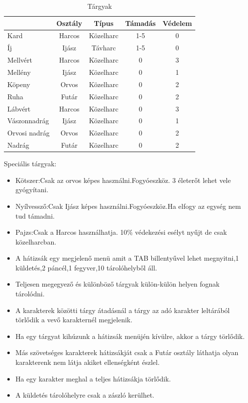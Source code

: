 \newpage


\begin{table}[!ht]
\centering
\caption{Tárgyak}
\label{tab:table4}
\begin{tabular}{|l|c|c|c|c|}
\hline
 & Osztály &Típus & Támadás & Védelem  \\
\hline
Kard & Harcos & Közelharc & 1-5 & 0 \\
\hline
Íj & Ijász & Távharc & 1-5 & 0  \\
\hline
Mellvért & Harcos & Közelharc & 0 & 3   \\
\hline
Mellény & Ijász & Közelharc & 0 & 1   \\
\hline
Köpeny & Orvos & Közelharc & 0 & 2    \\
\hline
Ruha & Futár & Közelharc & 0 & 2    \\
\hline
Lábvért & Harcos & Közelharc & 0 & 3    \\
\hline
Vászonnadrág & Ijász & Közelharc & 0 & 1    \\
\hline
Orvosi nadrág  & Orvos & Közelharc & 0 & 2    \\
\hline
Nadrág & Futár & Közelharc & 0 & 2   \\
\hline
\end{tabular}
\end{table}

Speciális tárgyak:
\begin{itemize}
  \item Kötszer:Csak az orvos képes használni.Fogyóeszköz. 3 életerőt lehet vele gyógyítani.
  \item Nyílvessző:Csak Ijász képes használni.Fogyóeszköz.Ha elfogy az egység nem tud támadni.
  \item Pajzs:Csak a Harcos használhatja. 10\% védekezési esélyt nyűjt de csak közelharcban.
\end{itemize}


\begin{itemize}
  \item A hátizsák egy megjelenő menü amit a TAB billentyűvel lehet megnyitni,1 küldetés,2 páncél,1 fegyver,10 tárolóhelyből áll.
  \item Teljesen megegyező és különböző tárgyak külön-külön helyen fognak tárolódni.
  \item A karakterek közötti tárgy átadásnál a tárgy az adó karakter leltárából törlődik a vevő karakternél megjelenik.
  \item Ha egy tárgyat kihúzunk a hátizsák menüjén kívülre, akkor a tárgy törlődik.
  \item Más szövetséges karakterek hátizsákját csak a Futár osztály láthatja olyan karakterenk nem látja akiket ellenségként észlel.
  \item Ha egy karakter meghal a teljes hátizsákja törlődik.
  \item A küldetés tárolóhelyre csak a zászló kerülhet.
\end{itemize}

